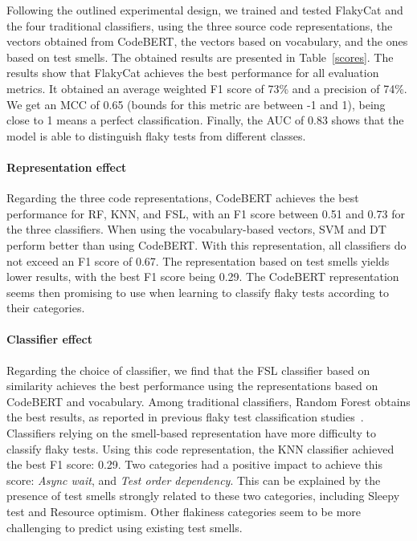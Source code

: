 Following the outlined experimental design, we trained and tested FlakyCat and the four traditional classifiers, using the three source code representations, the vectors obtained from CodeBERT, the vectors based on vocabulary, and the ones based on test smells. The obtained results are presented in Table~\ref{scores}. The results show that FlakyCat achieves the best performance for all evaluation metrics. 
It obtained an average weighted F1 score of 73\% and a precision of 74\%.
We get an MCC of 0.65 (bounds for this metric are between -1 and 1), being close to 1 means a perfect classification. Finally, the AUC of 0.83 shows that the model is able to distinguish flaky tests from different classes. 

\paragraph{Representation effect}
Regarding the three code representations, CodeBERT achieves the best performance for RF, KNN, and FSL, with an F1 score between 0.51 and 0.73 for the three classifiers. 
When using the vocabulary-based vectors, SVM and DT perform better than using CodeBERT. With this representation, all classifiers do not exceed an F1 score of 0.67.
The representation based on test smells yields lower results, with the best F1 score being 0.29.
The CodeBERT representation seems then promising to use when learning to classify flaky tests according to their categories. 

\paragraph{Classifier effect}
Regarding the choice of classifier, we find that the FSL classifier based on similarity achieves the best performance using the representations based on CodeBERT and vocabulary. Among traditional classifiers, Random Forest obtains the best results, as reported in previous flaky test classification studies~\cite{Pinto2020,Haben2021}. Classifiers relying on the smell-based representation have more difficulty to classify flaky tests. Using this code representation, the KNN classifier achieved the best F1 score: 0.29. Two categories had a positive impact to achieve this score: \textit{Async wait}, and \textit{Test order dependency}. This can be explained by the presence of test smells strongly related to these two categories, including Sleepy test and Resource optimism. Other flakiness categories seem to be more challenging to predict using existing test smells. 

